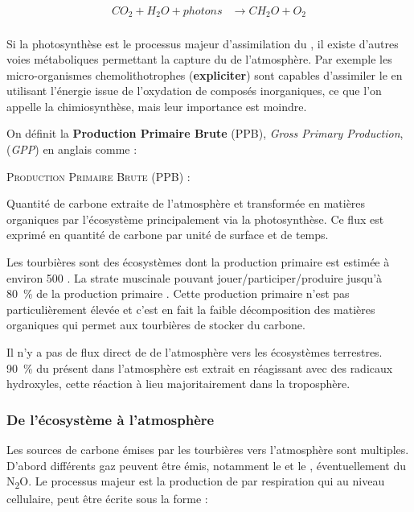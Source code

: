 $$\begin{aligned}
CO_{2} + H_{2}O + photons &\rightarrow CH_{2}O + O_{2}\\
\end{aligned} $$

Si la photosynthèse est le processus majeur d'assimilation du \coo, il existe d'autres voies métaboliques permettant la capture du \coo de l'atmosphère.
Par exemple les micro-organismes chemolithotrophes (\textbf{expliciter}) sont capables d'assimiler le \coo en utilisant l'énergie issue de l'oxydation de composés inorganiques, ce que l'on appelle la chimiosynthèse, mais leur importance est moindre.

On définit la \textbf{Production Primaire Brute} (PPB), \textit{Gross Primary Production}, (\textit{GPP}) en anglais
comme :

\begin{pdef}
\textsc{Production Primaire Brute (PPB)} :

Quantité de carbone extraite de l'atmosphère et transformée en matières organiques par l'écosystème principalement via la photosynthèse.
Ce flux est exprimé en quantité de carbone par unité de surface et de temps.
\end{pdef}

Les tourbières sont des écosystèmes dont la production primaire est estimée à environ \SI{500}{\gcm} \citep{francez2000}.
La strate muscinale pouvant jouer/participer/produire jusqu'à \SI{80}{\percent} de la production primaire \citep{francez2000}.
Cette production primaire n'est pas particulièrement élevée \plop et c'est en fait la faible décomposition des matières organiques qui permet aux tourbières de stocker du carbone.

Il n'y a pas de flux direct de \chh de l'atmosphère vers les écosystèmes terrestres.
\SI{90}{\percent} du \chh présent dans l'atmosphère est extrait en réagissant avec des radicaux hydroxyles, cette réaction à lieu majoritairement dans la troposphère.

\subsubsection{De l'écosystème à l'atmosphère}

Les sources de carbone émises par les tourbières vers l'atmosphère sont multiples.
D'abord différents gaz peuvent être émis, notamment le \coo et le \chh, éventuellement du N\textsubscript{2}O.
Le processus majeur est la production de \coo par respiration qui au niveau cellulaire, peut être écrite sous la forme :

